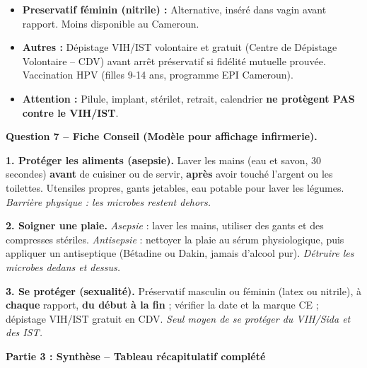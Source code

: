 \documentclass[11pt]{article}
\begin{document}
\begin{exoresolu}
\begin{itemize}
\begin{itemize}
        \item \textbf{Preservatif féminin (nitrile) :} Alternative, inséré dans vagin avant rapport. Moins disponible au Cameroun.
        \item \textbf{Autres :} Dépistage VIH/IST volontaire et gratuit (Centre de Dépistage Volontaire -- CDV) avant arrêt préservatif si fidélité mutuelle prouvée. Vaccination HPV (filles 9-14 ans, programme EPI Cameroun).
        \item \textbf{Attention :} Pilule, implant, stérilet, retrait, calendrier \textbf{ne protègent PAS contre le VIH/IST}.
    \end{itemize}
\end{itemize}

\textbf{Question 7 -- Fiche Conseil (Modèle pour affichage infirmerie).}

\begin{exemplebox}
\textbf{1. Protéger les aliments (asepsie).} Laver les mains (eau et savon, 30 secondes) \textbf{avant} de cuisiner ou de servir, \textbf{après} avoir touché l'argent ou les toilettes. Utensiles propres, gants jetables, eau potable pour laver les légumes. \emph{Barrière physique : les microbes restent dehors.}

\textbf{2. Soigner une plaie.} \emph{Asepsie} : laver les mains, utiliser des gants et des compresses stériles. \emph{Antisepsie} : nettoyer la plaie au sérum physiologique, puis appliquer un antiseptique (Bétadine\textregistered{} ou Dakin\textregistered{}, jamais d'alcool pur). \emph{Détruire les microbes dedans et dessus.}

\textbf{3. Se protéger (sexualité).} Préservatif masculin ou féminin (latex ou nitrile), à \textbf{chaque} rapport, \textbf{du début à la fin} ; vérifier la date et la marque CE ; dépistage VIH/IST gratuit en CDV. \emph{Seul moyen de se protéger du VIH/Sida et des IST.}
\end{exemplebox}

\textbf{Partie 3 : Synthèse -- Tableau récapitulatif complété}


\end{exoresolu}
\end{document}
